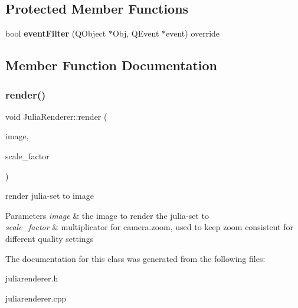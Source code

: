 \subsection*{Protected Member Functions}
\begin{DoxyCompactItemize}
\item 
\mbox{\label{classJuliaRenderer_a21a8248c28cf0035a14ad1ef98761356}} 
bool {\bfseries event\+Filter} (Q\+Object $\ast$Obj, Q\+Event $\ast$event) override
\end{DoxyCompactItemize}


\subsection{Member Function Documentation}
\mbox{\label{classJuliaRenderer_a2231caba8e65e19eb3074670c96e705f}} 
\subsubsection{\texorpdfstring{render()}{render()}}
{\footnotesize\ttfamily void Julia\+Renderer\+::render (\begin{DoxyParamCaption}\item[{Q\+Image \&}]{image,  }\item[{double}]{scale\+\_\+factor }\end{DoxyParamCaption})}



render julia-\/set to image 


\begin{DoxyParams}{Parameters}
{\em image} & the image to render the julia-\/set to \\
\hline
{\em scale\+\_\+factor} & multiplicator for camera.\+zoom, used to keep zoom consistent for different quality settings \\
\hline
\end{DoxyParams}


The documentation for this class was generated from the following files\+:\begin{DoxyCompactItemize}
\item 
juliarenderer.\+h\item 
juliarenderer.\+cpp\end{DoxyCompactItemize}
